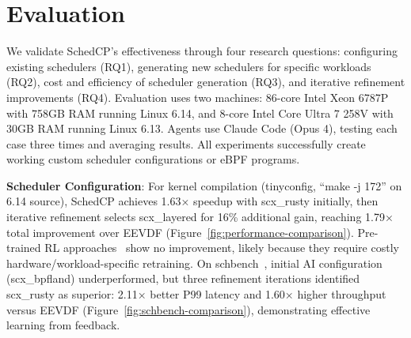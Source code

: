 \documentclass[preprint]{article}
\newcommand{\sys}{SchedCP\xspace}
\begin{document}
\section{Evaluation}
\label{sec:evaluation}


We validate \sys's effectiveness through four research questions: configuring existing schedulers (RQ1), generating new schedulers for specific workloads (RQ2), cost and efficiency of scheduler generation (RQ3), and iterative refinement improvements (RQ4). Evaluation uses two machines: 86-core Intel Xeon 6787P with 758GB RAM running Linux 6.14, and 8-core Intel Core Ultra 7 258V with 30GB RAM running Linux 6.13. Agents use Claude Code (Opus 4), testing each case three times and averaging results. All experiments successfully create working custom scheduler configurations or eBPF programs.

\textbf{Scheduler Configuration}: For kernel compilation (tinyconfig, ``make -j 172'' on 6.14 source), \sys achieves 1.63× speedup with scx\_rusty initially, then iterative refinement selects scx\_layered for 16\% additional gain, reaching 1.79× total improvement over EEVDF (Figure~\ref{fig:performance-comparison}). Pre-trained RL approaches~\cite{corbet2025ml} show no improvement, likely because they require costly hardware/workload-specific retraining. On schbench~\cite{schbench2016}, initial AI configuration (scx\_bpfland) underperformed, but three refinement iterations identified scx\_rusty as superior: 2.11× better P99 latency and 1.60× higher throughput versus EEVDF (Figure~\ref{fig:schbench-comparison}), demonstrating effective learning from feedback.
\end{document}
